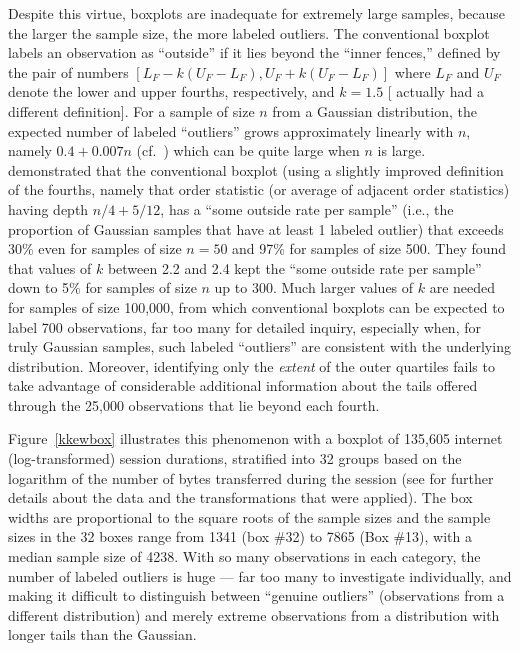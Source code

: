\documentclass[oneside]{article}
\begin{document}
Despite this virtue, boxplots are inadequate for extremely large samples,
because the larger the sample size, the more labeled outliers. The
conventional boxplot \citep{eda, emerson83} labels an observation as
``outside'' if it lies beyond the ``inner fences,'' defined by the pair of
numbers $[L_F - k(U_F - L_F), U_F + k(U_F - L_F)]$ where $L_F$ and $U_F$
denote the lower and upper fourths, respectively, and $k = 1.5$ [\citet{eda}
actually had a different definition]. For a sample of size $n$ from a Gaussian
distribution, the expected number of labeled ``outliers'' grows approximately
linearly with $n$, namely $0.4 + 0.007n$ (cf.~\citet{dchlv}) which can be
quite large when $n$ is large. \citet[pg. 1148]{dchbox} demonstrated that the
conventional boxplot (using a slightly improved definition of the fourths,
namely that order statistic (or average of adjacent order statistics) having
depth $n/4 + 5/12$, has a ``some outside rate per sample'' (i.e., the
proportion of Gaussian samples that have at least 1 labeled outlier) that
exceeds 30\% even for samples of size $n = 50$ and 97\% for samples of size
500. They found that values of $k$ between 2.2 and 2.4 kept the ``some outside
rate per sample'' down to 5\% for samples of size $n$ up to 300. Much larger
values of $k$ are needed for samples of size 100,000, from which conventional
boxplots can be expected to label 700 observations, far too many for detailed
inquiry, especially when, for truly Gaussian samples, such labeled
``outliers'' are consistent with the underlying distribution. Moreover,
identifying only the \textit{extent} of the outer quartiles fails to take
advantage of considerable additional information about the tails offered
through the 25,000 observations that lie beyond each fourth.

Figure~\ref{kkewbox} illustrates this phenomenon with a boxplot of 135,605
internet (log-transformed) session durations, stratified into 32 groups based
on the logarithm of the number of bytes transferred during the session (see
\citet{kw06} for further details about the data and the transformations that
were applied). The box widths are proportional to the square roots of the
sample sizes \citep{variations.boxplots} and the sample sizes in the 32 boxes
range from 1341 (box \#32) to 7865 (Box \#13), with a median sample size of
4238. With so many observations in each category, the number of labeled
outliers is huge --- far too many to investigate individually, and making it
difficult to distinguish between ``genuine outliers'' (observations from a
different distribution) and merely extreme observations from a distribution
with longer tails than the Gaussian. 
\end{document}
